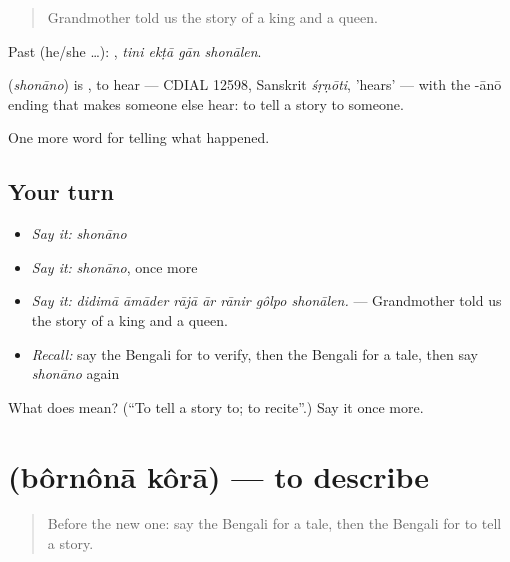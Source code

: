 \begin{quote}
Grandmother told us the story of a king and a queen.
\end{quote}

Past (he/she …):    , \emph{tini ekṭā gān shonālen}.

\begin{cousinweb}
\textbf{} (\emph{shonāno}) is \textbf{}, to hear — CDIAL 12598, Sanskrit \emph{śṛṇōti}, 'hears' — with the -ānō ending that makes someone else hear: to tell a story to someone.
\end{cousinweb}

\begin{grammarlens}[title={What you've built}]
One more word for telling what happened.
\end{grammarlens}

\subsection*{Your turn}
\begin{itemize}
\raggedright
  \item \emph{Say it:} \emph{shonāno}
  \item \emph{Say it:} \emph{shonāno}, once more
  \item \emph{Say it:} \emph{didimā āmāder rājā ār rānir gôlpo shonālen.} — Grandmother told us the story of a king and a queen.
  \item \emph{Recall:} say the Bengali for to verify, then the Bengali for a tale, then say \emph{shonāno} again
\end{itemize}

\begin{tcolorbox}[breakable,colback=teal!4,colframe=teal!35!black,title={Before you move on}]
What does  mean? (\textquotedblleft{}To tell a story to; to recite\textquotedblright{}.) Say it once more.
\end{tcolorbox}
\section[\texorpdfstring{\bn{বর্ণনা} \bn{করা} (bôrnônā kôrā)}{বর্ণনা করা (bôrnônā kôrā)}]{  (bôrnônā kôrā) — to describe}

\label{lesson:BN-C302-bornona-kora}



\begin{quote}
Before the new one: say the Bengali for a tale, then the Bengali for to tell a story.
\end{quote}


